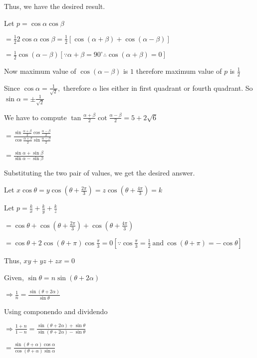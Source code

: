   Thus, we have the desired result.

\item Let $p = \cos\alpha\cos\beta$

  $= \frac{1}{2}2\cos\alpha\cos\beta = \frac{1}{2}\left[\cos(\alpha + \beta) + \cos(\alpha - \beta)\right]$

  $= \frac{1}{2}\cos(\alpha - \beta)[\because \alpha + \beta = 90^\circ \therefore \cos(\alpha + \beta) = 0]$

  Now maximum value of $\cos(\alpha - \beta)$ is $1$ therefore maximum value of $p$ is $\frac{1}{2}$

\item Since $\cos\alpha = \frac{1}{\sqrt{2}},$ therefore $\alpha$ lies either in first quadrant or fourth quadrant. So
  $\sin\alpha = \pm\frac{1}{\sqrt{2}}$

  We have to compute $\tan\frac{\alpha + \beta}{2}\cot\frac{\alpha - \beta}{2} = 5 + 2\sqrt{6}$

  $= \frac{\sin\frac{\alpha + \beta}{2}\cos\frac{\alpha - \beta}{2}}{\cos\frac{\alpha + \beta}{2}\sin\frac{\alpha -
      \beta}{2}}$

  $= \frac{\sin\alpha + \sin\beta}{\sin\alpha - \sin\beta}$

  Substituting the two pair of values, we get the desired answer.

\item Let $x\cos\theta = y\cos\left(\theta + \frac{2\pi}{3}\right) = z\cos\left(\theta + \frac{4\pi}{3}\right) = k$

  Let $p = \frac{k}{x} + \frac{k}{y} + \frac{k}{z}$

  $= \cos\theta + \cos\left(\theta + \frac{2\pi}{3}\right) + \cos\left(\theta + \frac{4\pi}{3}\right)$

  $= \cos\theta + 2\cos(\theta + \pi)\cos\frac{\pi}{3} = 0[\because \cos\frac{\pi}{3} =
    \frac{1}{2}~\text{and}~\cos(\theta + \pi) = -\cos\theta]$

  Thus, $xy + yz + zx = 0$

\item Given, $\sin\theta = n\sin(\theta + 2\alpha)$

  $\Rightarrow \frac{1}{n} = \frac{\sin(\theta + 2\alpha)}{\sin\theta}$

  Using componendo and dividendo

  $\Rightarrow \frac{1 + n}{1 - n} = \frac{\sin(\theta + 2\alpha) + \sin\theta}{\sin(\theta + 2\alpha) - \sin\theta}$

  $= \frac{\sin(\theta + \alpha)\cos\alpha}{\cos(\theta + \alpha)\sin\alpha}$

